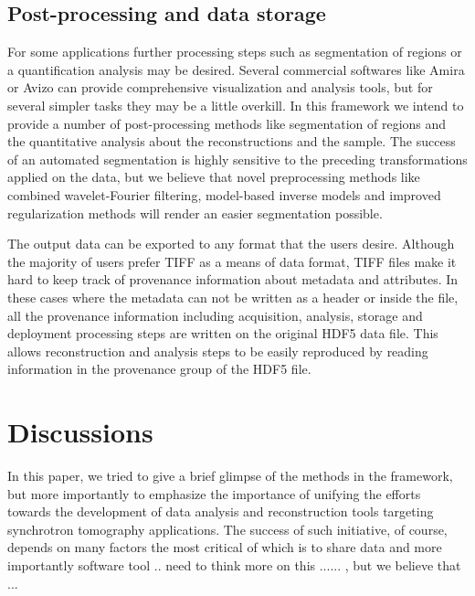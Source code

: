 \documentclass[pdf]{iucr}              %
\begin{document}
\subsection{Post-processing and data storage}

For some applications further processing steps such as segmentation of regions or a quantification analysis may be desired. Several commercial softwares like Amira or Avizo \cite{amira_avizo} can provide comprehensive visualization and analysis tools, but for several simpler tasks they may be a little overkill. In this framework we intend to provide a number of post-processing methods like segmentation of regions and  the quantitative analysis about the reconstructions and the sample. The success of an automated segmentation is highly sensitive to the preceding transformations applied on the data, but we believe that novel preprocessing methods like combined wavelet-Fourier filtering, model-based inverse models and improved regularization methods will render an easier segmentation possible. 

The output data can be exported to any format that the users desire. Although the majority of users prefer TIFF as a means of data format, TIFF files make it hard to keep track of provenance information about metadata and attributes. In these cases where the metadata can not be written as a header or inside the file, all the provenance information including acquisition, analysis, storage and deployment processing steps are written on the original HDF5 data file. This allows reconstruction and analysis steps to be easily reproduced by reading information in the provenance group of the HDF5 file. 


\section{Discussions}

In this paper, we tried to give a brief glimpse of the methods in the framework, but more importantly to emphasize the importance of unifying the efforts towards the development of data analysis and reconstruction tools targeting synchrotron tomography applications. The success of such initiative, of course, depends on many factors the most critical of which is to share data and more importantly software tool .. need to think more on this ...... , but we believe that ...

\end{document}
